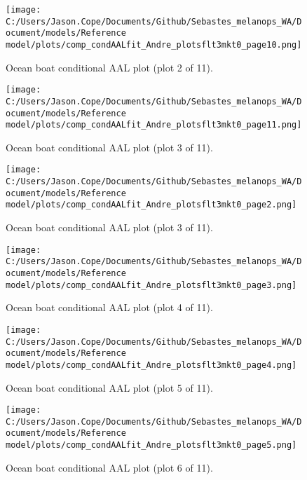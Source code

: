 \documentclass[11pt,
  english,
  letterpaper,
]{article}
\begin{document}
\begin{figure}
\centering
\texttt{[image: C:/Users/Jason.Cope/Documents/Github/Sebastes\_melanops\_WA/Document/models/Reference model/plots/comp\_condAALfit\_Andre\_plotsflt3mkt0\_page10.png]}
\caption{Ocean boat conditional AAL plot (plot 2 of 11).\label{fig:comp_condAALfit_Andre_plotsflt3mkt0_page10}}
\end{figure}

\begin{figure}
\centering
\texttt{[image: C:/Users/Jason.Cope/Documents/Github/Sebastes\_melanops\_WA/Document/models/Reference model/plots/comp\_condAALfit\_Andre\_plotsflt3mkt0\_page11.png]}
\caption{Ocean boat conditional AAL plot (plot 3 of 11).\label{fig:comp_condAALfit_Andre_plotsflt3mkt0_page11}}
\end{figure}

\begin{figure}
\centering
\texttt{[image: C:/Users/Jason.Cope/Documents/Github/Sebastes\_melanops\_WA/Document/models/Reference model/plots/comp\_condAALfit\_Andre\_plotsflt3mkt0\_page2.png]}
\caption{Ocean boat conditional AAL plot (plot 3 of 11).\label{fig:comp_condAALfit_Andre_plotsflt3mkt0_page2}}
\end{figure}

\begin{figure}
\centering
\texttt{[image: C:/Users/Jason.Cope/Documents/Github/Sebastes\_melanops\_WA/Document/models/Reference model/plots/comp\_condAALfit\_Andre\_plotsflt3mkt0\_page3.png]}
\caption{Ocean boat conditional AAL plot (plot 4 of 11).\label{fig:comp_condAALfit_Andre_plotsflt3mkt0_page3}}
\end{figure}

\begin{figure}
\centering
\texttt{[image: C:/Users/Jason.Cope/Documents/Github/Sebastes\_melanops\_WA/Document/models/Reference model/plots/comp\_condAALfit\_Andre\_plotsflt3mkt0\_page4.png]}
\caption{Ocean boat conditional AAL plot (plot 5 of 11).\label{fig:comp_condAALfit_Andre_plotsflt3mkt0_page4}}
\end{figure}

\begin{figure}
\centering
\texttt{[image: C:/Users/Jason.Cope/Documents/Github/Sebastes\_melanops\_WA/Document/models/Reference model/plots/comp\_condAALfit\_Andre\_plotsflt3mkt0\_page5.png]}
\caption{Ocean boat conditional AAL plot (plot 6 of 11).\label{fig:comp_condAALfit_Andre_plotsflt3mkt0_page5}}
\end{figure}
\end{document}
